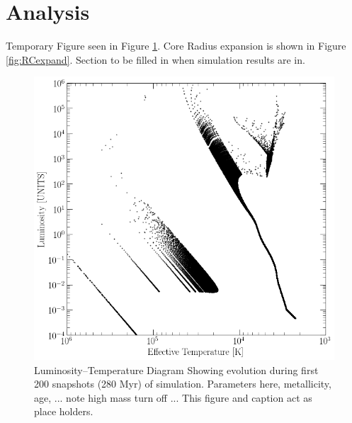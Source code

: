 \documentclass[twocolumn]{aastex62}
\begin{document}
\section{Analysis}\label{sec:analysis}
Temporary Figure seen in Figure \ref{fig:HR}. Core Radius expansion is shown in Figure \ref{fig:RCexpand}. Section to be filled in when simulation results are in.
\begin{figure}
    \centering
    \includegraphics[scale=0.35]{Figures/10000BasicEvolutionHR.png}
    \caption{Luminosity--Temperature Diagram Showing evolution during first 200 snapshots (280 Myr) of simulation. Parameters here, metallicity, age, ... note high mass turn off ... This figure and caption act as place holders.}
    \label{fig:HR}
\end{figure}
\end{document}
